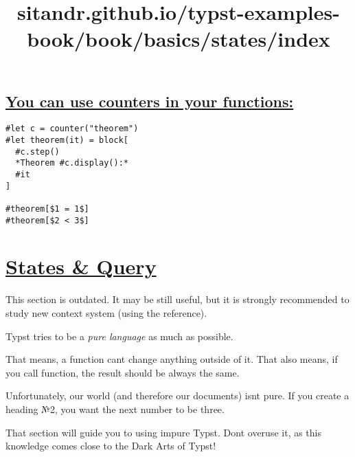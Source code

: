 \subsection{\texorpdfstring{\hyperref[you-can-use-counters-in-your-functions]{You
can use counters in your
functions:}}{You can use counters in your functions:}}\label{you-can-use-counters-in-your-functions}

\begin{verbatim}
#let c = counter("theorem")
#let theorem(it) = block[
  #c.step()
  *Theorem #c.display():*
  #it
]

#theorem[$1 = 1$]
#theorem[$2 < 3$]
\end{verbatim}

\pandocbounded{}


\title{sitandr.github.io/typst-examples-book/book/basics/states/index}

\section{\texorpdfstring{\hyperref[states--query]{States \&
Query}}{States \& Query}}\label{states--query}

This section is outdated. It may be still useful, but it is strongly
recommended to study new context system (using the reference).

Typst tries to be a \emph{pure language} as much as possible.

That means, a function can\textquotesingle t change anything outside of
it. That also means, if you call function, the result should be always
the same.

Unfortunately, our world (and therefore our documents)
isn\textquotesingle t pure. If you create a heading №2, you want the
next number to be three.

That section will guide you to using impure Typst. Don\textquotesingle t
overuse it, as this knowledge comes close to the Dark Arts of Typst!


